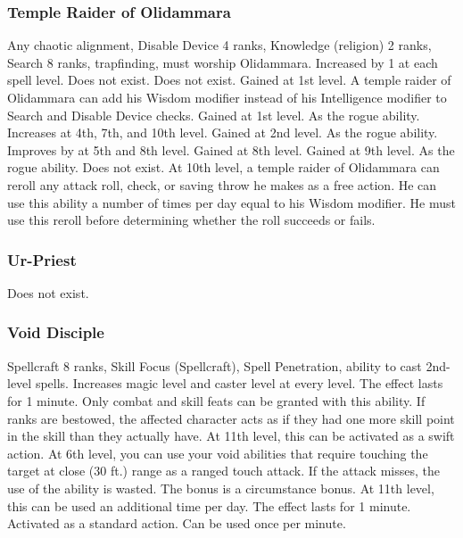 \subsubsection{Temple Raider of Olidammara}
 Any chaotic alignment, Disable Device 4 ranks, Knowledge (religion) 2 ranks, Search 8 ranks, trapfinding, must worship Olidammara.
 Increased by 1 at each spell level.
 Does not exist.
 Does not exist.
 Gained at 1st level. A temple raider of Olidammara can add his Wisdom modifier instead of his Intelligence modifier to Search and Disable Device checks.
 Gained at 1st level. As the rogue ability. Increases at 4th, 7th, and 10th level.
 Gained at 2nd level. As the rogue ability. Improves by  at 5th and 8th level.
 Gained at 8th level.
 Gained at 9th level. As the rogue ability.
 Does not exist.
 At 10th level, a temple raider of Olidammara can reroll any attack roll, check, or saving throw he makes as a free action. He can use this ability a number of times per day equal to his Wisdom modifier. He must use this reroll before determining whether the roll succeeds or fails.
\subsubsection{Ur-Priest}
Does not exist.
\subsubsection{Void Disciple}
 Spellcraft 8 ranks, Skill Focus (Spellcraft), Spell Penetration, ability to cast 2nd-level spells.
 Increases magic level and caster level at every level.
 The effect lasts for 1 minute. Only combat and skill feats can be granted with this ability. If ranks are bestowed, the affected character acts as if they had one more skill point in the skill than they actually have. At 11th level, this can be activated as a swift action.
 At 6th level, you can use your void abilities that require touching the target at close (30 ft.) range as a ranged touch attack. If the attack misses, the use of the ability is wasted.
 The bonus is a circumstance bonus. At 11th level, this can be used an additional time per day.
 The effect lasts for 1 minute. Activated as a standard action.
 Can be used once per minute.
